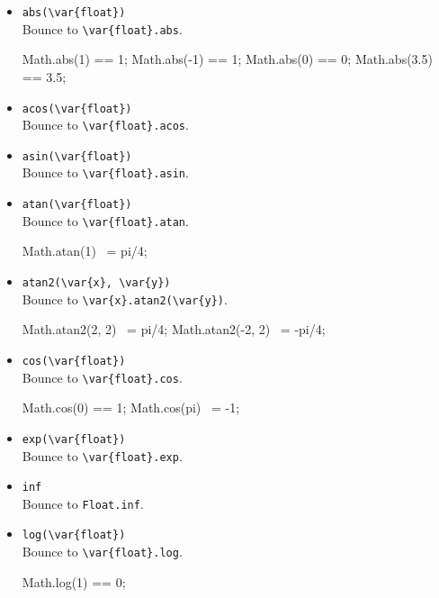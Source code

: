 \begin{itemize}
\item \lstinline|abs(\var{float})|\\
  Bounce to \lstinline|\var{float}.abs|.
\begin{urbiassert}[firstnumber=last]
Math.abs(1) == 1;
Math.abs(-1) == 1;
Math.abs(0) == 0;
Math.abs(3.5) == 3.5;
\end{urbiassert}
\item \lstinline|acos(\var{float})|\\
  Bounce to \lstinline|\var{float}.acos|.

\item \lstinline|asin(\var{float})|\\
  Bounce to \lstinline|\var{float}.asin|.

\item \lstinline|atan(\var{float})|\\
  Bounce to \lstinline|\var{float}.atan|.
\begin{urbiassert}[firstnumber=last]
Math.atan(1) ~= pi/4;
\end{urbiassert}

\item \lstinline|atan2(\var{x}, \var{y})|\\
  Bounce to \lstinline|\var{x}.atan2(\var{y})|.
\begin{urbiassert}[firstnumber=last]
Math.atan2(2, 2) ~= pi/4;
Math.atan2(-2, 2) ~= -pi/4;
\end{urbiassert}

\item \lstinline|cos(\var{float})|\\
  Bounce to \lstinline|\var{float}.cos|.
\begin{urbiassert}[firstnumber=last]
Math.cos(0) == 1;
Math.cos(pi) ~= -1;
\end{urbiassert}

\item \lstinline|exp(\var{float})|\\
  Bounce to \lstinline|\var{float}.exp|.

\item \lstinline|inf|\\
  Bounce to \lstinline|Float.inf|.

\item \lstinline|log(\var{float})|\\
  Bounce to \lstinline|\var{float}.log|.
\begin{urbiassert}[firstnumber=last]
Math.log(1) == 0;
\end{urbiassert}


\end{itemize}

